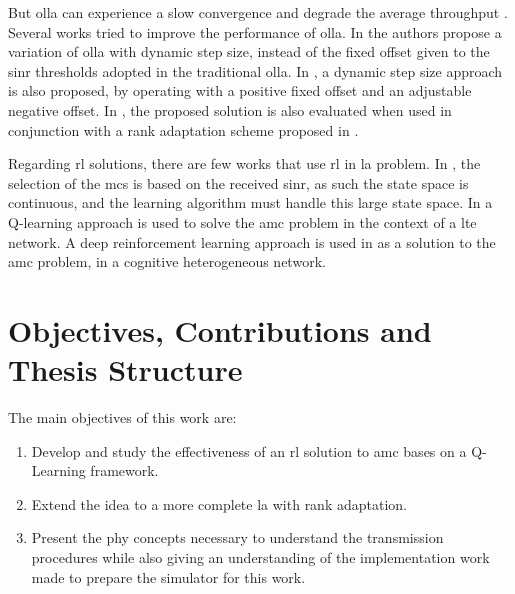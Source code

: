 But \gls{olla} can experience a slow convergence and degrade the average throughput \cite{10.1145/3341216.3342212}.
%
Several works tried to improve the performance of \gls{olla}.
%
In \cite{Blanquez-Casado2016} the authors propose a variation of \gls{olla} with dynamic step size, instead of the fixed offset given to the \gls{sinr} thresholds adopted in the traditional \gls{olla}.
%
In \cite{Sarret2015}, a dynamic step size approach is also proposed, by operating with a positive fixed offset and an adjustable negative offset.
%
In \cite{Sarret2015}, the proposed solution is also evaluated when used in conjunction with a rank adaptation scheme proposed in \cite{catania2015distributed}.

Regarding \gls{rl} solutions, there are few works that use \gls{rl} in \gls{la} problem.
%
In \cite{continuousState}, the selection of the \gls{mcs} is based on the received \gls{sinr}, as such the state space is continuous, and the learning algorithm must handle this large state space.
%
In \cite{bruno2014robust} a Q-learning approach is used to solve the \gls{amc} problem in the context of a \gls{lte} network.
%
A deep reinforcement learning approach is used in \cite{DRL_AMC} as a solution to the \gls{amc} problem, in a cognitive heterogeneous network.


\section{Objectives, Contributions and Thesis Structure}

The main objectives of this work are:
\begin{enumerate}
    \item Develop and study the effectiveness of an \gls{rl} solution to \gls{amc} bases on a Q-Learning framework.
    \item Extend the idea to a more complete \gls{la} with rank adaptation.
    \item Present the \gls{phy} concepts necessary to understand the transmission procedures while also giving an understanding of the implementation work made to prepare the simulator for this work.
\end{enumerate}

